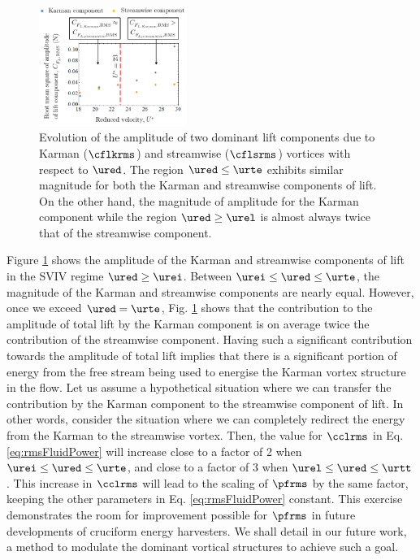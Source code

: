 \documentclass[a4paper,fleqn]{cas-sc}
\begin{document}
\begin{figure}
  \centering
  \includegraphics[width=0.43\textwidth]{figs/figure22}
  \caption{Evolution of the \rms{} amplitude of two dominant lift components due to Karman ($\cflkrms$) and streamwise ($\cflsrms$) vortices with respect to $\ured$. The region $\ured \leq \urte$ exhibits similar magnitude for both the Karman and streamwise components of lift. On the other hand, the magnitude of amplitude for the Karman component while the region $\ured \geq \urel$ is almost always twice that of the streamwise component.}
  \label{fig:karmanStreamwiseComponents}
\end{figure}

Figure \ref{fig:karmanStreamwiseComponents} shows the \rms{} amplitude of the Karman and streamwise components of lift in the SVIV regime $\ured \geq \urei$. Between $\urei \leq \ured \leq \urte$, the magnitude of the Karman and streamwise components are nearly equal. However, once we exceed $\ured = \urte$, Fig. \ref{fig:karmanStreamwiseComponents} shows that the contribution to the \rms{} amplitude of total lift by the Karman component is on average twice the contribution of the streamwise component. Having such a significant contribution towards the \rms{} amplitude of total lift implies that there is a significant portion of energy from the free stream being used to energise the Karman vortex structure in the flow. Let us assume a hypothetical situation where we can transfer the contribution by the Karman component to the streamwise component of lift. In other words, consider the situation where we can completely redirect the energy from the Karman to the streamwise vortex. Then, the value for $\cclrms$ in Eq. \ref{eq:rmsFluidPower} will increase close to a factor of 2 when $\urei \leq \ured \leq \urte$, and close to a factor of 3 when $\urel \leq \ured \leq \urtt$. This increase in $\cclrms$ will lead to the scaling of $\pfrms$ by the same factor, keeping the other parameters in Eq. \ref{eq:rmsFluidPower} constant. This exercise demonstrates the room for improvement possible for $\pfrms$ in future developments of cruciform energy harvesters. We shall detail in our future work, a method to modulate the dominant vortical structures to achieve such a goal.
\end{document}
